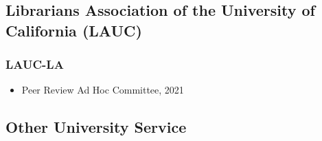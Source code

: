 
\subsection{Librarians Association of the University of California (LAUC)}
\subsubsection{LAUC-LA}
\begin{itemize}[label={},leftmargin=!,labelindent=5pt,itemindent=-15pt]
\item Peer Review Ad Hoc Committee, 2021
\end{itemize}

\subsection{Other University Service}

